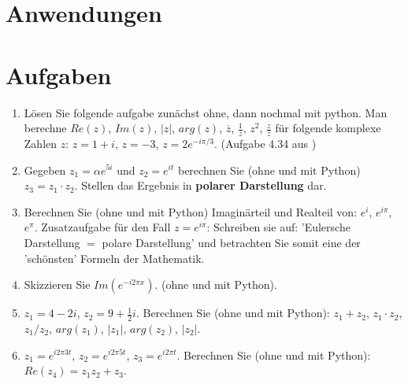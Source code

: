 
\section{Anwendungen}\label{sec:anwendungen}


\section{Aufgaben}
\begin{enumerate}
\item Lösen Sie folgende aufgabe zunächst ohne, dann nochmal mit python. Man berechne $Re(z)$, $Im(z)$, $|z|$, $arg(z)$, $\overline{z}$, $\frac{1}{z}$, $z^2$, $\frac{z}{\overline{z}}$ für folgende komplexe Zahlen $z$: $z=1+i$, $z=-3$, $z=2e^{-i\pi/3}$. (Aufgabe 4.34 aus \cite{merziger2024repetitorium})

\item Gegeben $z_1 = \alpha e^{5i}$ und $z_2 = e^{it}$ berechnen Sie (ohne und mit Python) $z_3 = z_1 \cdot z_2$. Stellen das Ergebnis in \textbf{polarer Darstellung} dar. 

\item Berechnen Sie (ohne und mit Python) Imaginärteil und Realteil von: $e^i$, $e^{i\pi}$, $e^{\pi}$. Zusatzaufgabe für den Fall $z=e^{i\pi}$: Schreiben sie auf: 'Eulersche Darstellung $=$ polare Darstellung' und betrachten Sie somit eine der 'schönsten' Formeln der Mathematik.

\item Skizzieren Sie $Im(e^{-i 2\pi x})$. (ohne und mit Python).

\item $z_1 = 4-2i$, $z_2 = 9+\frac{1}{2}i$. Berechnen Sie (ohne und mit Python): $z_1 + z_2$, $z_1 \cdot z_2$, $z_1 / z_2$, $arg(z_1)$, $|z_1|$, $arg(z_2)$, $|z_2|$.

\item $z_1 = e^{ i 2\pi 3 t}$, $z_2 = e^{ i 2\pi 5 t}$, $z_3 = e^{ i 2\pi t}$. Berechnen Sie (ohne und mit Python): $Re(z_4) = z_1 z_2 + z_3$.



\end{enumerate}


